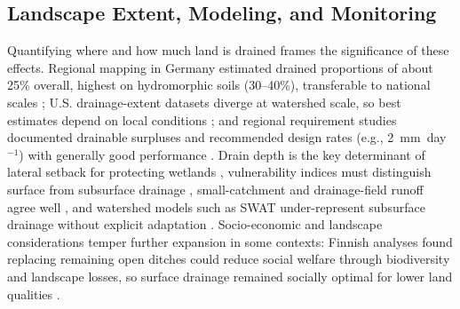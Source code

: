 \subsection{Landscape Extent, Modeling, and Monitoring}

Quantifying where and how much land is drained frames the significance of these
effects. Regional mapping in Germany estimated drained proportions of about 25\%
overall, highest on hydromorphic soils (30--40\%), transferable to national scales
\parencite{Hirt2005,Hirt2011}; U.S. drainage-extent datasets diverge at watershed
scale, so best estimates depend on local conditions \parencite{Jame2022}; and
regional requirement studies documented drainable surpluses and recommended design
rates (e.g., 2~mm~day$^{-1}$) with generally good performance
\parencite{Kumar2006,Güngör2023,Ali2001,MartínezBeltrán2007,Rimidis2003}. Drain
depth is the key determinant of lateral setback for protecting wetlands
\parencite{Tangen2018}, vulnerability indices must distinguish surface from
subsurface drainage \parencite{Baffaut2020}, small-catchment and drainage-field
runoff agree well \parencite{Veinbergs2022}, and watershed models such as SWAT
under-represent subsurface drainage without explicit adaptation
\parencite{Manguerra1998,Golmohammadi2016}. Socio-economic and landscape
considerations temper further expansion in some contexts: Finnish analyses found
replacing remaining open ditches could reduce social welfare through biodiversity
and landscape losses, so surface drainage remained socially optimal for lower land
qualities \parencite{HietalaKoivu2004,Saikkonen2014}.

